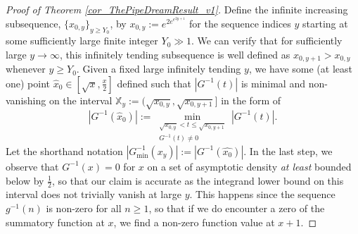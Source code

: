 \documentclass[11pt,reqno,a4letter]{article}
\numberwithin{figure}{section}
\numberwithin{table}{section}
\theoremstyle{plain}
\numberwithin{theorem}{section}
\theoremstyle{definition}
\begin{document}
\begin{proof}[Proof of Theorem \ref{cor_ThePipeDreamResult_v1}] 
\label{proofOf_cor_ThePipeDreamResult_v1} 
Define the infinite increasing subsequence, 
$\{x_{0,y}\}_{y \geq Y_0}$, by $x_{0,y} := e^{2e^{e^{2y+1}}}$ for the sequence indices $y$ 
starting at some sufficiently 
large finite integer $Y_0 \gg 1$. 
We can verify that for sufficiently large $y \rightarrow \infty$, this infinitely 
tending subsequence is well defined as $x_{0,y+1} > x_{0,y}$ whenever $y \geq Y_0$. 
Given a fixed large infinitely tending $y$, we have some (at least one) point 
$\widehat{x}_0 \in \left[\sqrt{x}, \frac{x}{2}\right]$ defined such that 
$|G^{-1}(t)|$ is minimal and non-vanishing on the interval 
$\mathbb{X}_y := (\sqrt{x_{0,y}}, \sqrt{x_{0,y+1}}]$ 
in the form of 
\[
\left\lvert G^{-1}(\widehat{x}_0) \right\rvert := 
     \min_{\substack{\sqrt{x_{0,y}} < t \leq \sqrt{x_{0,y+1}} \\ G^{-1}(t) \neq 0}} |G^{-1}(t)|. 
\] 
Let the shorthand notation $|G_{\min}^{-1}(x_y)| := |G^{-1}(\widehat{x_0})|$. 
In the last step, we observe that $G^{-1}(x) = 0$ for $x$ on a set of 
asymptotic density \emph{at least} bounded below by $\frac{1}{2}$, so that our 
claim is accurate as the integrand lower bound on this interval 
does not trivially vanish at large $y$. This happens since the sequence 
$g^{-1}(n)$ is non-zero for all $n \geq 1$, so that if we do encounter a zero of the 
summatory function at $x$, we find a non-zero function value at $x+1$. 


\end{proof}
\end{document}
